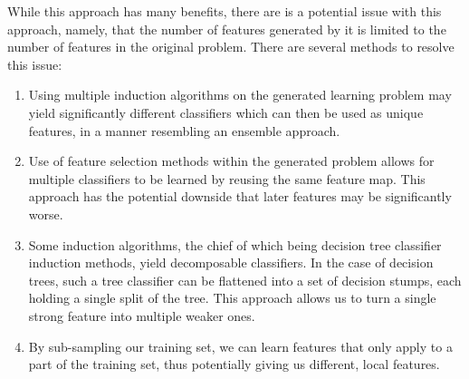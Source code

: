 \documentclass[twoside,11pt]{article}
\theoremstyle{definition}
\begin{document}
While this approach has many benefits, there are is a potential issue with this approach, namely, that the number of features generated by it is limited to the number of features in the original problem. There are several methods to resolve this issue:
\begin{enumerate}
	\item Using multiple induction algorithms on the generated learning problem may yield significantly different classifiers which can then be used as unique features, in a manner resembling an ensemble approach.
	\item Use of feature selection methods within the generated problem allows for multiple classifiers to be learned by reusing the same feature map. This approach has the potential downside that later features may be significantly worse.
	\item Some induction algorithms, the chief of which being decision tree classifier induction methods, yield decomposable classifiers. In the case of decision trees, such a tree classifier can be flattened into a set of decision stumps, each holding a single split of the tree. This approach allows us to turn a single strong feature into multiple weaker ones.
	\item By sub-sampling our training set, we can learn features that only apply to a part of the training set, thus potentially giving us different, local features.
\end{enumerate}


\end{document}
